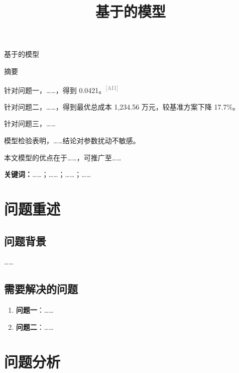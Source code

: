 \documentclass[UTF8,12pt,fontset=windows]{ctexart}
\title{\zihao{3}\heiti 基于\underline{\quad\quad}的\underline{\quad\quad}模型}
\author{}
\date{}
\newcommand{\res}[1]{\textcolor{red}{\textbf{??#1??}}}
\newcommand{\aiflag}[1]{\textsuperscript{\textcolor{gray}{[AI#1]}}}
\begin{document}
\begin{center}
{\heiti 基于\underline{\quad\quad}的\underline{\quad\quad}模型}
\end{center}

\vspace{0.5em}
\begin{center}
{\heiti 摘\quad 要}
\end{center}

针对问题一，……，得到 0.0421。\aiflag{1}

针对问题二，……，得到最优总成本 1,234.56 万元，较基准方案下降 17.7\%。

针对问题三，……

模型检验表明，……结论对参数扰动不敏感。

本文模型的优点在于……，可推广至……

\vspace{0.8em}
\noindent\textbf{关键词：}\quad ……；……；……；……

\newpage


\section{问题重述}

\subsection{问题背景}
……

\subsection{需要解决的问题}
\begin{enumerate}
  \item \textbf{问题一}：……
  \item \textbf{问题二}：……
\end{enumerate}

\section{问题分析}
\end{document}
